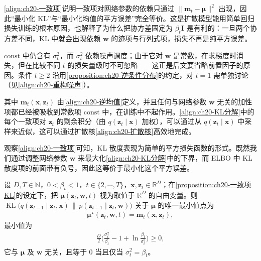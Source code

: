 \documentclass[../../main.tex]{subfiles}
\begin{document}
\begin{remark}
\eqref{align:ch20-一致项}说明一致项对网络参数的依赖只通过 $\|\bm{m}_t-\bm{\mu}\|^2$ 出现，因此“最小化 KL”与“最小化均值的平方误差”完全等价。这是扩散模型能用简单回归损失训练的根本原因，也解释了为什么把协方差固定为 $\beta_t\bm{I}$ 是有利的：一旦两个协方差不同，KL 中就会出现依赖 $\bm{w}$ 的迹项与行列式项，损失不再是纯平方误差。\par
$\mathrm{const}$ 中仍含有 $\sigma_t^2$，而 $\sigma_t^2$ 依赖噪声调度；由于它对 $\bm{w}$ 是常数，在求梯度时消失，但在比较不同 $t$ 的损失量级时不可忽略——这正是后文要省略前置因子的原因。条件 $t\geqslant2$ 沿用\cref{proposition:ch20-逆条件分布}的约定，对 $t=1$ 需单独讨论（见\eqref{align:ch20-重构噪声}）。
\end{remark}

其中 $\bm{m}_t(\bm{x},\bm{z}_t)$ 由\eqref{align:ch20-逆均值}定义，并且任何与网络参数 $\bm{w}$ 无关的加性项都已经被吸收到常数项 $\mathrm{const}$ 中，在训练中不起作用。\eqref{align:ch20-KL分解}中的每个一致项对 $\bm{z}_t$ 的剩余积分（由 $q(\bm{z}_t\mid\bm{x})$ 加权），可以通过从 $q(\bm{z}_t\mid\bm{x})$ 中采样来近似，这可以通过扩散核\eqref{align:ch20-扩散核}高效地完成。

观察\eqref{align:ch20-一致项}可知，KL 散度表现为简单的平方损失函数的形式。既然我们通过调整网络参数 $\bm{w}$ 来最大化\eqref{align:ch20-KL分解}中的下界，而 ELBO 中 KL 散度项的前面带有负号，因此这等价于最小化这个平方误差。

\begin{proposition}[最优反向均值]\label{proposition:ch20-最优反向均值}
设 $D,T\in\mathbb{N}$，$0<\beta_t<1$，$t\in\{2,\cdots,T\}$，$\bm{x},\bm{z}_t\in\mathbb{R}^{D}$；在\cref{proposition:ch20-一致项KL}的设定下，把 $\bm{\mu}(\bm{z}_t,\bm{w},t)$ 视为取值于 $\mathbb{R}^{D}$ 的自由变量。则 $\operatorname{KL}\big(q(\bm{z}_{t-1}\mid\bm{z}_t,\bm{x})\,\|\,p(\bm{z}_{t-1}\mid\bm{z}_t,\bm{w})\big)$ 关于 $\bm{\mu}$ 的唯一最小值点为
\begin{align}
\bm{\mu}^{\star}(\bm{z}_t,\bm{w},t)=\bm{m}_t(\bm{x},\bm{z}_t),
\label{align:ch20-最优均值}
\end{align}
最小值为
\begin{align*}
\frac{D}{2}\Big(\frac{\sigma_t^{2}}{\beta_t}-1+\ln\frac{\beta_t}{\sigma_t^{2}}\Big)\geqslant0,
\end{align*}
它与 $\bm{\mu}$ 及 $\bm{w}$ 无关，且等于 $0$ 当且仅当 $\sigma_t^{2}=\beta_t$。
\end{proposition}
\end{document}
